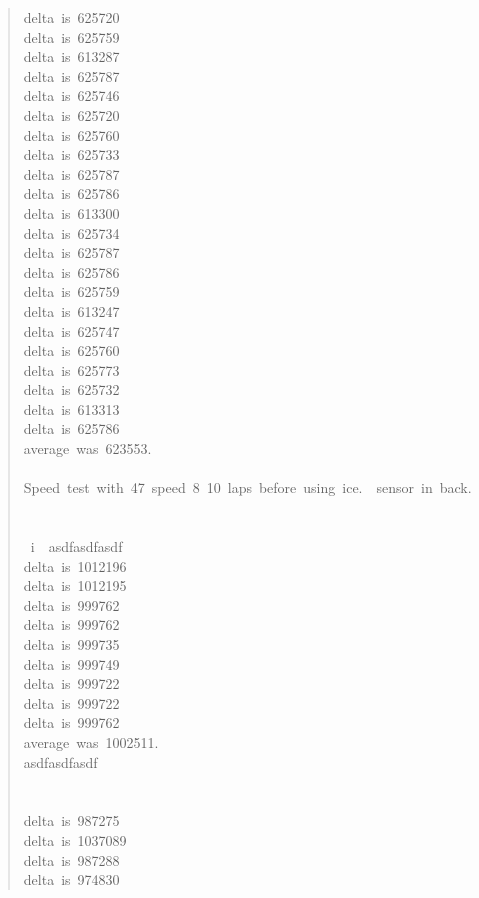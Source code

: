 \documentclass[letterpaper]{article}
\begin{document}
\begin{quote}
{delta~is~625720\\
delta~is~625759\\
delta~is~613287\\
delta~is~625787\\
delta~is~625746\\
delta~is~625720\\
delta~is~625760\\
delta~is~625733\\
delta~is~625787\\
delta~is~625786\\
delta~is~613300\\
delta~is~625734\\
delta~is~625787\\
delta~is~625786\\
delta~is~625759\\
delta~is~613247\\
delta~is~625747\\
delta~is~625760\\
delta~is~625773\\
delta~is~625732\\
delta~is~613313\\
delta~is~625786\\
average~was~623553.\\
~\\
Speed~test~with~47~speed~8~10~laps~before~using~ice.~~sensor~in~back.\\
~\\
~\\
~i~~asdfasdfasdf\\
delta~is~1012196\\
delta~is~1012195\\
delta~is~999762\\
delta~is~999762\\
delta~is~999735\\
delta~is~999749\\
delta~is~999722\\
delta~is~999722\\
delta~is~999762\\
average~was~1002511.\\
asdfasdfasdf\\
~\\
~\\
delta~is~987275\\
delta~is~1037089\\
delta~is~987288\\
delta~is~974830\\
}
\end{quote}
\end{document}
